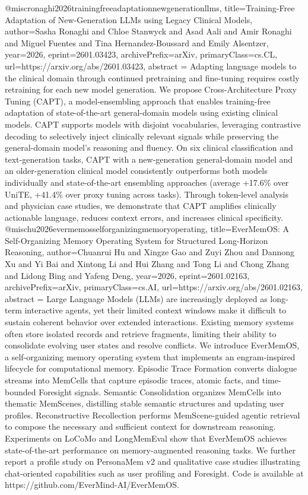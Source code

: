 {}@misc{ronaghi2026trainingfreeadaptationnewgenerationllms,
      title={Training-Free Adaptation of New-Generation LLMs using Legacy Clinical Models}, 
      author={Sasha Ronaghi and Chloe Stanwyck and Asad Aali and Amir Ronaghi and Miguel Fuentes and Tina Hernandez-Boussard and Emily Alsentzer},
      year={2026},
      eprint={2601.03423},
      archivePrefix={arXiv},
      primaryClass={cs.CL},
      url={https://arxiv.org/abs/2601.03423},
      abstract = {Adapting language models to the clinical domain through continued pretraining and fine-tuning requires costly retraining for each new model generation. We propose Cross-Architecture Proxy Tuning (CAPT), a model-ensembling approach that enables training-free adaptation of state-of-the-art general-domain models using existing clinical models. CAPT supports models with disjoint vocabularies, leveraging contrastive decoding to selectively inject clinically relevant signals while preserving the general-domain model's reasoning and fluency. On six clinical classification and text-generation tasks, CAPT with a new-generation general-domain model and an older-generation clinical model consistently outperforms both models individually and state-of-the-art ensembling approaches (average +17.6\% over UniTE, +41.4\% over proxy tuning across tasks). Through token-level analysis and physician case studies, we demonstrate that CAPT amplifies clinically actionable language, reduces context errors, and increases clinical specificity.}
}@misc{hu2026evermemosselforganizingmemoryoperating,
      title={EverMemOS: A Self-Organizing Memory Operating System for Structured Long-Horizon Reasoning}, 
      author={Chuanrui Hu and Xingze Gao and Zuyi Zhou and Dannong Xu and Yi Bai and Xintong Li and Hui Zhang and Tong Li and Chong Zhang and Lidong Bing and Yafeng Deng},
      year={2026},
      eprint={2601.02163},
      archivePrefix={arXiv},
      primaryClass={cs.AI},
      url={https://arxiv.org/abs/2601.02163},
      abstract = {Large Language Models (LLMs) are increasingly deployed as long-term interactive agents, yet their limited context windows make it difficult to sustain coherent behavior over extended interactions. Existing memory systems often store isolated records and retrieve fragments, limiting their ability to consolidate evolving user states and resolve conflicts. We introduce EverMemOS, a self-organizing memory operating system that implements an engram-inspired lifecycle for computational memory. Episodic Trace Formation converts dialogue streams into MemCells that capture episodic traces, atomic facts, and time-bounded Foresight signals. Semantic Consolidation organizes MemCells into thematic MemScenes, distilling stable semantic structures and updating user profiles. Reconstructive Recollection performs MemScene-guided agentic retrieval to compose the necessary and sufficient context for downstream reasoning. Experiments on LoCoMo and LongMemEval show that EverMemOS achieves state-of-the-art performance on memory-augmented reasoning tasks. We further report a profile study on PersonaMem v2 and qualitative case studies illustrating chat-oriented capabilities such as user profiling and Foresight. Code is available at https://github.com/EverMind-AI/EverMemOS.}
}
